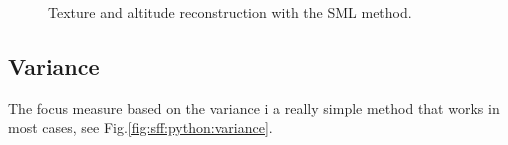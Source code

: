 \begin{figure}[H]
 \centering\caption{Texture and altitude reconstruction with the SML method.}%
 \hfill{}\hfill\hfill
 \hfill\null

\vspace*{-5pt}

 \hfill{}\hfill\hfill
 \hfill\null%
 \vspace*{-5pt}%
 \label{fig:sff:python:sml}%
\end{figure}


\subsection{Variance}
The focus measure based on the variance i a really simple method that works in most cases, see Fig.\ref{fig:sff:python:variance}.



